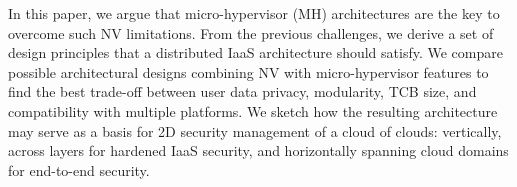 \documentclass{sig-alternate}
\begin{document}
{In this paper, we argue that micro-hypervisor (MH) architectures are the key to overcome such NV limitations. 
From the previous challenges, we derive a set of design principles that a distributed IaaS architecture should satisfy. 
We compare possible architectural designs combining NV with micro-hypervisor features to find the best trade-off between user data privacy, modularity, TCB size, and compatibility with multiple platforms. 
We sketch how the resulting architecture may serve as a basis for 2D security management of a cloud of clouds: vertically, across layers for hardened IaaS security, and horizontally spanning cloud domains for end-to-end security.
}

\end{document}
